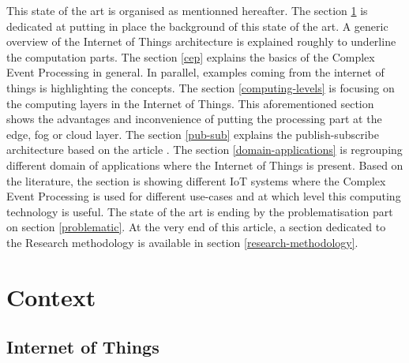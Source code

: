 \documentclass[11pt]{article}
\begin{document}
This state of the art is organised as mentionned hereafter. The section \ref{context} is dedicated at putting in place the background of this state of the art. A generic overview of the Internet of Things architecture is explained roughly to underline the computation parts. The section \ref{cep} explains the basics of the Complex Event Processing in general. In parallel, examples coming from the internet of things is highlighting the concepts. The section \ref{computing-levels} is focusing on the computing layers in the Internet of Things. This aforementioned section shows the advantages and inconvenience of putting the processing part at the edge, fog or cloud layer. The section \ref{pub-sub} explains the publish-subscribe architecture based on the article \cite{A-Semantic-Publish-Subscribe-Architecture}. The section \ref{domain-applications} is regrouping different domain of applications where the Internet of Things is present. Based on the literature, the section is showing different IoT systems where the Complex Event Processing is used for different use-cases and at which level this computing technology is useful. The state of the art is ending by the problematisation part on section \ref{problematic}. At the very end of this article, a section dedicated to the Research methodology is available in section \ref{research-methodology}.

\newpage

\section{Context} \label{context}

\subsection{Internet of Things}
\end{document}
